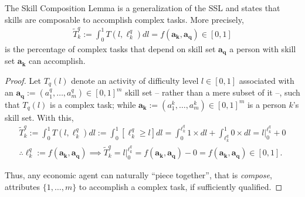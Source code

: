 \documentclass[hidelinks, nonatbib]{elsarticle}
\begin{document}
\begin{lemma}
    \label{scl}
    The Skill Composition Lemma is a generalization of the SSL and states that skills are composable to accomplish complex tasks. More precisely,
    \begin{gather}
        \tilde{T}_{k}^{q}
        :=
        \int_{0}^{1}
        T(l, \ell_{k}^{q})
        dl
        =
        f(\boldsymbol{a_k}, \boldsymbol{a_q})
        \in
        [0,1]
    \end{gather}
    is the percentage of complex tasks that depend on skill set $\boldsymbol{a_q}$ a person with skill set 
    $\boldsymbol{a_k}$ can accomplish.
    \begin{proof}
        Let $T_{q}(l)$ denote an activity of difficulty level $l \in [0,1]$ associated with an $\boldsymbol{a_q} := (a_{1}^{q}, \dots, a_{m}^{q}) \in [0,1]^m$ skill set -- rather than a mere subset of it --, such that $T_{q}(l)$ is a complex task; while $\boldsymbol{a_k} := (a_{1}^{k}, \dots, a_{m}^{k}) \in [0,1]^m$ is a person $k$'s skill set. With this,
        \begin{gather}
            \tilde{T}_{k}^{q}
            :=
            \int_{0}^{1}
            T(l, \ell_{k}^{q})
            dl
            :=
            \int_{0}^{1}
            [
                \ell_{k}^{q}
                \geq
                l
            ]
            dl
            =
            \int_{0}^{\ell_{k}^{q}}
            1
            \times
            dl
            +
            \int_{\ell_{k}^{q}}^{1}
            0
            \times
            dl
            =
            l\big|_{0}^{\ell_{k}^{q}}
            + 0
            \\
            \therefore
            \ell_{k}^{q}
            :=
            f(\boldsymbol{a_k}, \boldsymbol{a_q})
            \implies
            \tilde{T}_{k}^{q}
            =
            l\big|_{0}^{\ell_{k}^{q}}
            =
            f(\boldsymbol{a_k}, \boldsymbol{a_q})
            - 0
            =
            f(\boldsymbol{a_k}, \boldsymbol{a_q})
            \in
            [0,1]
            .
        \end{gather}
        
        Thus, any economic agent can naturally ``piece together'', that is \textit{compose}, attributes $\{1, \dots, m\}$ to accomplish a complex task, if sufficiently qualified.
    \end{proof}
\end{lemma}
\end{document}
